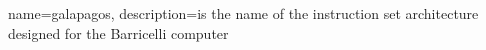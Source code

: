 {
name=galapagos,
description={is the name of the instruction set architecture designed for the Barricelli computer}
}
